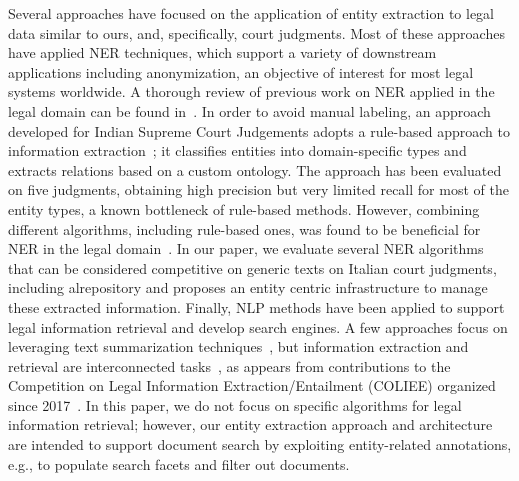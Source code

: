 Several approaches have focused on the application of entity extraction to legal data similar to ours, and, specifically, court judgments. Most of these approaches have applied NER techniques, which support a variety of downstream applications including anonymization, an objective of interest for most legal systems worldwide. A thorough review of previous work on NER applied in the legal domain can be found in~\cite{turkish_2023}. In order to avoid manual labeling, an approach developed for Indian Supreme Court Judgements adopts a rule-based approach to information extraction~\cite{sarika2022}; it classifies entities into domain-specific types and extracts relations based on a custom ontology. The approach has been evaluated on five judgments, obtaining high precision but very limited recall for most of the entity types, a known bottleneck of rule-based methods. However, combining different algorithms, including rule-based ones, was found to be beneficial for NER in the legal domain~\cite{andrew2018,leitner2019fine}. 
In our paper, we evaluate several NER algorithms that can be considered competitive on generic texts on Italian court judgments, including alrepository and proposes an entity centric infrastructure to manage these extracted information.
Finally, NLP methods have been applied to support legal information retrieval and develop search engines. A few approaches focus on leveraging text summarization techniques~\cite{passage_based_text_summarization_LIR_2019,combining_bandits_lexical_analysis_2020,hu2022bert_lf}, but information extraction and retrieval are interconnected tasks~\cite{CASTANO2022101842}, as appears from contributions to the Competition on Legal Information Extraction/Entailment (COLIEE) organized since 2017~\cite{cooliedescropt}. In this paper, we do not focus on specific algorithms for legal information retrieval; however, our entity extraction approach and architecture are intended to support document search by exploiting entity-related annotations, e.g., to populate search facets and filter out documents. 


 
  

